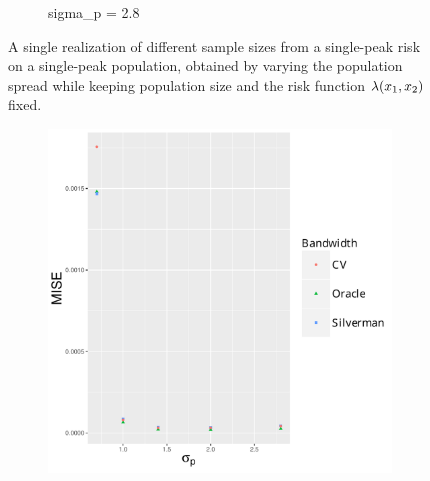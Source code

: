 \begin{figure}[htbp]
\begin{subfigure}{0.45\textwidth}
        \caption{\gls{sigma_p} = 2.8}
        \label{fig:one_sample:pSD_100_1h:2.8}
    \end{subfigure}
    \caption[Examples showing population spread]
        {A single realization of different sample sizes from a single-peak risk on a single-peak population, obtained by varying the population \gls{spread} while keeping population size and the risk function $\lambda (x_1, x_2)$ fixed.}
    \label{fig:one_sample:pSD_100_1h}
\end{figure}


\begin{figure}[htbp]
    \centering
    \begin{subfigure}[t]{0.24\textwidth}
        \includegraphics[width=\textwidth]{results/by_population_spread/MISE-vs-population-spread}
        \caption{}
        \label{fig:ise:pSD_100_1h:mise}
    \end{subfigure}
    \begin{subfigure}[t]{0.24\textwidth}

\end{subfigure}
\end{figure}
